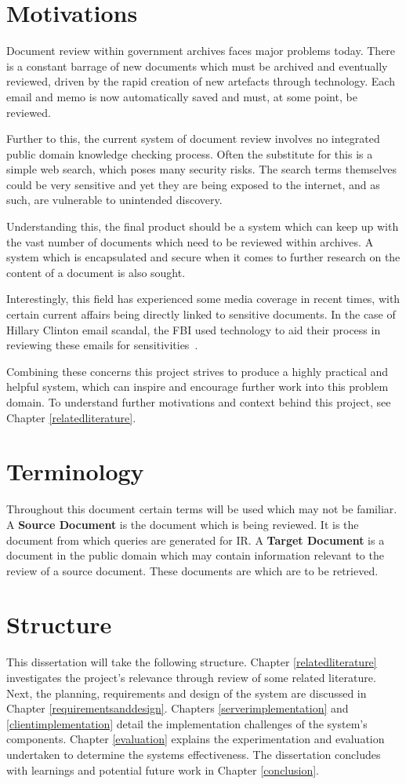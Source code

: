 \documentclass{l4proj}
\begin{document}
\section{Motivations}
Document review within government archives faces major problems today. There is a constant barrage of new documents which must be archived and eventually reviewed, driven by the rapid creation of new artefacts through technology. Each email and memo is now automatically saved and must, at some point, be reviewed.

Further to this, the current system of document review involves no integrated public domain knowledge checking process. Often the substitute for this is a simple web search, which poses many security risks. The search terms themselves could be very sensitive and yet they are being exposed to the internet, and as such, are vulnerable to unintended discovery.

Understanding this, the final product should be a system which can keep up with the vast number of documents which need to be reviewed within archives. A system which is encapsulated and secure when it comes to further research on the content of a document is also sought.

Interestingly, this field has experienced some media coverage in recent times, with certain current affairs being directly linked to sensitive documents. In the case of Hillary Clinton email scandal, the FBI used technology to aid their process in reviewing these emails for sensitivities~\cite{cnnclinton}. 

Combining these concerns this project strives to produce a highly practical and helpful system, which can inspire and encourage further work into this problem domain. To understand further motivations and context behind this project, see Chapter \ref{relatedliterature}.

\section{Terminology}
Throughout this document certain terms will be used which may not be familiar.
A \textbf{Source Document} is the document which is being reviewed. It is the document from which queries are generated for IR.
A \textbf{Target Document} is a document in the public domain which may contain information relevant to the review of a source document. These documents are which are to be retrieved.

\section{Structure}
This dissertation will take the following structure.
Chapter \ref{relatedliterature} investigates the project's relevance through review of some related literature.
Next, the planning, requirements and design of the system are discussed in Chapter \ref{requirementsanddesign}.
Chapters \ref{serverimplementation} and \ref{clientimplementation} detail the implementation challenges of the system's components.
Chapter \ref{evaluation} explains the experimentation and evaluation undertaken to determine the systems effectiveness. The dissertation concludes with learnings and potential future work in Chapter \ref{conclusion}.
\end{document}
